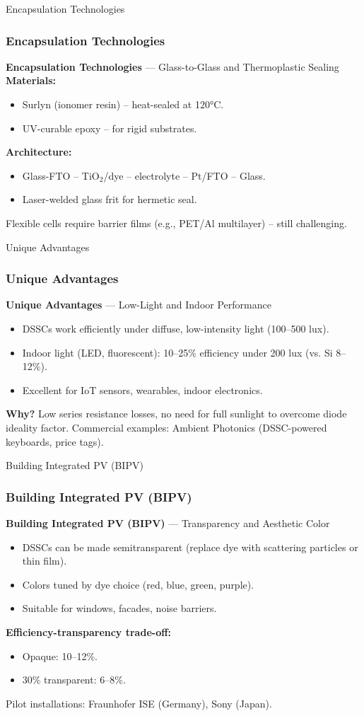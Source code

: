 \documentclass[aspectratio=169]{beamer}
\begin{document}
\begin{frame}{Encapsulation Technologies}
\frametitle{Encapsulation Technologies}

\textbf{Encapsulation Technologies} — Glass-to-Glass and Thermoplastic Sealing
\textbf{Materials:}
\begin{itemize}
\item Surlyn (ionomer resin) – heat-sealed at 120°C.
\item UV-curable epoxy – for rigid substrates.
\end{itemize}
\textbf{Architecture:}
\begin{itemize}
\item Glass-FTO – TiO$_2$/dye – electrolyte – Pt/FTO – Glass.
\item Laser-welded glass frit for hermetic seal.
\end{itemize}
Flexible cells require barrier films (e.g., PET/Al multilayer) – still challenging.
\cite{Sastrawan2006}
\end{frame}


\begin{frame}{Unique Advantages}
\frametitle{Unique Advantages}

\textbf{Unique Advantages} — Low-Light and Indoor Performance
\begin{itemize}
\item DSSCs work efficiently under diffuse, low-intensity light (100–500 lux).
\item Indoor light (LED, fluorescent): 10–25\% efficiency under 200 lux (vs. Si 8–12\%).
\item Excellent for IoT sensors, wearables, indoor electronics.
\end{itemize}
\textbf{Why?} Low series resistance losses, no need for full sunlight to overcome diode ideality factor.
\vspace{2mm}
Commercial examples: Ambient Photonics (DSSC-powered keyboards, price tags).
\cite{Freitag2017}
\end{frame}


\begin{frame}{Building Integrated PV (BIPV)}
\frametitle{Building Integrated PV (BIPV)}

\textbf{Building Integrated PV (BIPV)} — Transparency and Aesthetic Color
\begin{itemize}
\item DSSCs can be made semitransparent (replace dye with scattering particles or thin film).
\item Colors tuned by dye choice (red, blue, green, purple).
\item Suitable for windows, facades, noise barriers.
\end{itemize}
\textbf{Efficiency-transparency trade-off:}
\begin{itemize}
\item Opaque: 10–12\%.
\item 30\% transparent: 6–8\%.
\end{itemize}
Pilot installations: Fraunhofer ISE (Germany), Sony (Japan).
\cite{Yoon2011}
\end{frame}
\end{document}
